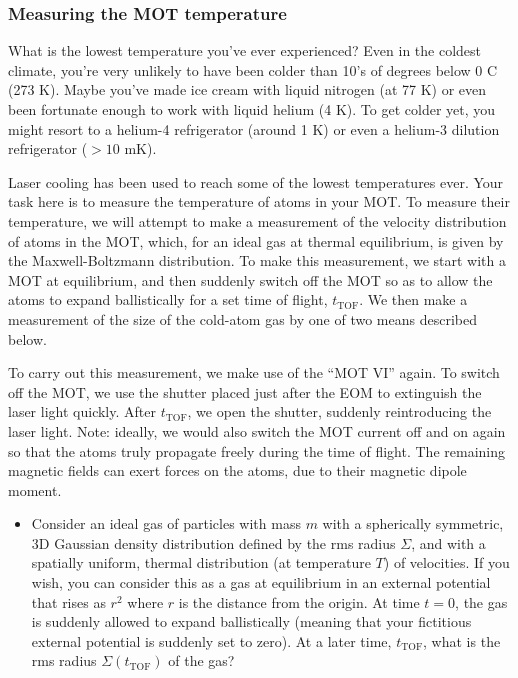 \documentclass{../lab}
\begin{document}
\subsubsection{Measuring the MOT temperature}
\label{subsubsec:MeasuringMOTTemperature}

What is the lowest temperature you've ever experienced? Even in the coldest climate, you're very unlikely to have been colder than 10's of degrees below 0 C (273 K). Maybe you've made ice cream with liquid nitrogen (at 77 K) or even been fortunate enough to work with liquid helium (4 K). To get colder yet, you might resort to a helium-4 refrigerator (around 1 K) or even a helium-3 dilution refrigerator ($>10$ mK).

Laser cooling has been used to reach some of the lowest temperatures ever. Your task here is to measure the temperature of atoms in your MOT. To measure their temperature, we will attempt to make a measurement of the velocity distribution of atoms in the MOT, which, for an ideal gas at thermal equilibrium, is given by the Maxwell-Boltzmann distribution. To make this measurement, we start with a MOT at equilibrium, and then suddenly switch off the MOT so as to allow the atoms to expand ballistically for a set time of flight, $t_\text{TOF}$. We then make a measurement of the size of the cold-atom gas by one of two means described below.

To carry out this measurement, we make use of the ``MOT VI'' again. To switch off the MOT, we use the shutter placed just after the EOM to extinguish the laser light quickly. After $t_\text{TOF}$, we open the shutter, suddenly reintroducing the laser light. Note: ideally, we would also switch the MOT current off and on again so that the atoms truly propagate freely during the time of flight. The remaining magnetic fields can exert forces on the atoms, due to their magnetic dipole moment.

\begin{itemize}
    \item Consider an ideal gas of particles with mass $m$ with a spherically symmetric, 3D Gaussian density distribution defined by the rms radius $\Sigma$, and with a spatially uniform, thermal distribution (at temperature $T$) of velocities. If you wish, you can consider this as a gas at equilibrium in an external potential that rises as $r^2$ where $r$ is the distance from the origin. At time $t = 0$, the gas is suddenly allowed to expand ballistically (meaning that your fictitious external potential is suddenly set to zero). At a later time, $t_\text{TOF}$, what is the rms radius $\Sigma(t_\text{TOF})$ of the gas?
\end{itemize}
\end{document}
